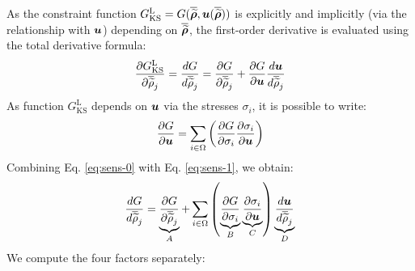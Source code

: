 As the constraint function $G_{\text{KS}}^\text{L} = G(\bm{\overline{\widetilde{\rho}}}, \bm{u}(\bm{\overline{\widetilde{\rho}}}) )$ is explicitly and implicitly (via the relationship with $\bm{u}$) depending on $\bm{\overline{\widetilde{\rho}}}$, the first-order derivative is evaluated using the total derivative formula:
\begin{equation} \label{eq:sens-0}
    \frac{\partial G_{\text{KS}}^\text{L}}{\partial\overline{\widetilde{\rho}}_j} = \frac{d G}{d \overline{\widetilde{\rho}}_j} = \frac{\partial G}{\partial \overline{\widetilde{\rho}}_j} + \frac{\partial G}{\partial\bm{u}} \frac{d \bm{u} }{d \overline{\widetilde{\rho}}_j}
\end{equation}
As function $G_{\text{KS}}^\text{L}$ depends on $\bm{u}$ via the stresses $\sigma_i$, it is possible to write:
\begin{equation} \label{eq:sens-1}
    \frac{\partial G}{\partial\bm{u}} = \sum_{i \in \Omega} \left( \frac{\partial G}{\partial\sigma_i} \frac{\partial\sigma_i}{\partial\bm{u}}\right)
\end{equation}
Combining Eq. \ref{eq:sens-0} with Eq. \ref{eq:sens-1}, we obtain:
\begin{equation} \label{eq:sens-2}
    \frac{d G}{d \overline{\widetilde{\rho}}_j} = \underbrace{\frac{\partial G}{\partial\overline{\widetilde{\rho}}_j}}_A + \sum_{i \in \Omega} \left( \underbrace{\frac{\partial G}{\partial\sigma_i}}_B \underbrace{\frac{\partial\sigma_i}{\partial\bm{u}}}_C \right)  \underbrace{\frac{d \bm{u} }{d \overline{\widetilde{\rho}}_j}}_D
\end{equation}
We compute the four factors separately:

